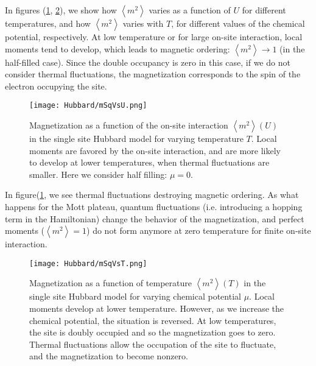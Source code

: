 In figures (\ref{fig:mSqVsU}, \ref{fig:mSqVsT}), we show how $\left\langle m^2 \right\rangle$ varies as a function of $U$ for different temperatures, and how $\left\langle m^2 \right\rangle$ varies with $T$, for different values of the chemical potential, respectively.
At low temperature or for large on-site interaction, local moments tend to develop, which leads to magnetic ordering: $\left\langle m^2 \right\rangle \rightarrow 1$ (in the half-filled case).
Since the double occupancy is zero in this case, if we do not consider thermal fluctuations, the magnetization corresponds to the spin of the electron occupying the site.

\begin{figure}[H]
	\centering
\hspace{12mm}\texttt{[image: Hubbard/mSqVsU.png]}
	\caption[Magnetization as a function of the on-site interaction $\left\langle m^2 \right\rangle (U)$ in the single site Hubbard model for varying temperature $T$.]{Magnetization as a function of the on-site interaction $\left\langle m^2 \right\rangle (U)$ in the single site Hubbard model for varying temperature $T$.
	Local moments are favored by the on-site interaction, and are more likely to develop at lower temperatures, when thermal fluctuations are smaller. Here we consider half filling: $\mu = 0$.}
	\label{fig:mSqVsU}
\end{figure}

In figure(\ref{fig:mSqVsU}, we see thermal fluctuations destroying magnetic ordering.
As what happens for the Mott plateau, quantum fluctuations (i.e. introducing a hopping term in the Hamiltonian) change the behavior of the magnetization, and perfect moments ($\left\langle m^2 \right\rangle =1$) do not form anymore at zero temperature for finite on-site interaction.

\begin{figure}[H]
	\centering
\hspace{12mm}\texttt{[image: Hubbard/mSqVsT.png]}
	\caption[Magnetization as a function of temperature $\left\langle m^2 \right\rangle (T)$ in the single site Hubbard model for varying chemical potential $\mu$.]{Magnetization as a function of temperature $\left\langle m^2 \right\rangle (T)$ in the single site Hubbard model for varying chemical potential $\mu$.
	Local moments develop at lower temperature.
	However, as we increase the chemical potential, the situation is reversed.
	At low temperatures, the site is doubly occupied and so the magnetization goes to zero.
	Thermal fluctuations allow the occupation of the site to fluctuate, and the magnetization to become nonzero.}
	\label{fig:mSqVsT}
\end{figure}

